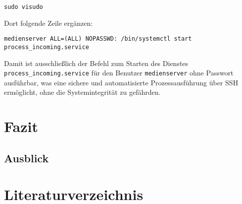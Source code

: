 \documentclass[12pt,a4paper]{report}
\begin{document}
    \begin{verbatim}
sudo visudo
    \end{verbatim}

    Dort folgende Zeile ergänzen:

    \begin{verbatim}
medienserver ALL=(ALL) NOPASSWD: /bin/systemctl start process_incoming.service
    \end{verbatim}

    Damit ist ausschließlich der Befehl zum Starten des Dienstes\\
    \texttt{process\_incoming.service} 
    für den Benutzer \texttt{medienserver} ohne Passwort ausführbar, 
    was eine sichere und automatisierte Prozessausführung über SSH ermöglicht, 
    ohne die Systemintegrität zu gefährden.
   
\chapter*{Fazit}
\setcounter{section}{0}

\section{Ausblick}


\cleardoublepage
\chapter*{Literaturverzeichnis}
\printbibliography[heading=none]
\end{document}
